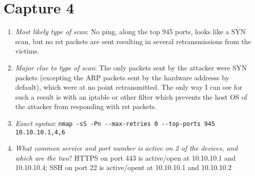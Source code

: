 \documentclass{article}
\begin{document}
\section{Capture 4}
\begin{enumerate}
	\item {\em Most likely type of scan}: No ping, along the top 945 ports,
		looks like a SYN scan, but no rst packets are sent resulting in
		several retransmissions from the victims. 
	\item {\em Major clue to type of scan}: The only packets sent by the
		attacker were SYN packets (excepting the ARP packets sent by
		the hardware addresss by default), which were at no point
		retransmitted. The only way I can see for such a result is with
		an iptable or other filter which prevents the host OS of the
		attacker from responding with rst packets.
	\item {\em Exact syntax}: \verb|nmap -sS -Pn --max-retries 0 --top-ports 945 10.10.10.1,4,6|
	\item {\em What common service and port number is
		active on 2 of the devices, and which are
		the two}? HTTPS on port 443 is active/open
		at 10.10.10.1 and 10.10.10.4; SSH on port
		22 is active/opent at 10.10.10.1 and
		10.10.10.2
\end{enumerate}
\end{document}
